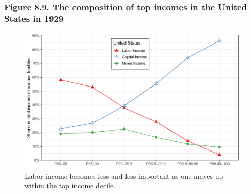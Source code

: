 \documentclass[t]{beamer}\usepackage[]{graphicx}\usepackage[]{color}
\newenvironment{knitrout}{}{} %
\begin{document}
\begin{frame}[label=Figure_8_9,fragile]
\frametitle{Figure 8.9. The composition of top incomes in the United States in 1929}
\begin{figure}[t]
\begin{minipage}[b]{\textwidth}
\centering
\begin{knitrout}\footnotesize
{}\color{fgcolor}

{\centering \includegraphics[width=1\linewidth]{figures/color/Figure_8_9} 

}



\end{knitrout}
\caption{Labor income becomes less and less important as one moves up within the top income decile.}
\end{minipage}
\end{figure}
\end{frame}
\end{document}
